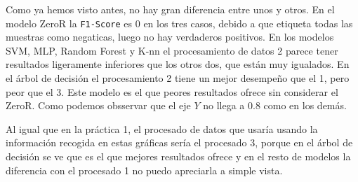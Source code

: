 \documentclass[a4]{article}
\begin{document}
\begin{figure}[H]
  \centering
\end{figure}

Como ya hemos visto antes, no hay gran diferencia entre unos y otros. En el modelo ZeroR la \texttt{F1-Score} es $0$ en los tres casos, debido a que etiqueta todas las muestras como negaticas, luego no hay verdaderos positivos. En los modelos SVM, MLP, Random Forest y K-nn el procesamiento de datos 2 parece tener resultados ligeramente inferiores que los otros dos, que están muy igualados. En el árbol de decisión el procesamiento 2 tiene un mejor desempeño que el 1, pero peor que el 3. Este modelo es el que peores resultados ofrece sin considerar el ZeroR. Como podemos obsservar que el eje $Y$ no llega a $0.8$ como en los demás.

Al igual que en la práctica 1, el procesado de datos  que usaría usando la información recogida en estas gráficas sería el procesado 3, porque en el árbol de decisión se ve que es el que mejores resultados ofrece y en el resto de modelos la diferencia con el procesado 1 no puedo apreciarla a simple vista.
\end{document}
